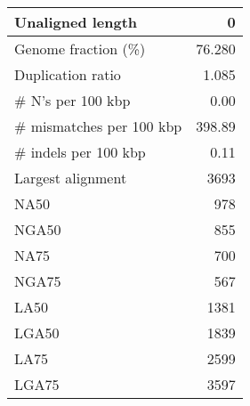 \documentclass[12pt,a4paper]{article}
\begin{document}
\begin{table}[ht]
\begin{center}
\begin{tabular}{|l*{1}{|r}|}
Unaligned length & 0 \\ \hline
Genome fraction (\%) & 76.280 \\ \hline
Duplication ratio & 1.085 \\ \hline
\# N's per 100 kbp & 0.00 \\ \hline
\# mismatches per 100 kbp & 398.89 \\ \hline
\# indels per 100 kbp & 0.11 \\ \hline
Largest alignment & 3693 \\ \hline
NA50 & 978 \\ \hline
NGA50 & 855 \\ \hline
NA75 & 700 \\ \hline
NGA75 & 567 \\ \hline
LA50 & 1381 \\ \hline
LGA50 & 1839 \\ \hline
LA75 & 2599 \\ \hline
LGA75 & 3597 \\ \hline
\end{tabular}
\end{center}
\end{table}
\end{document}
